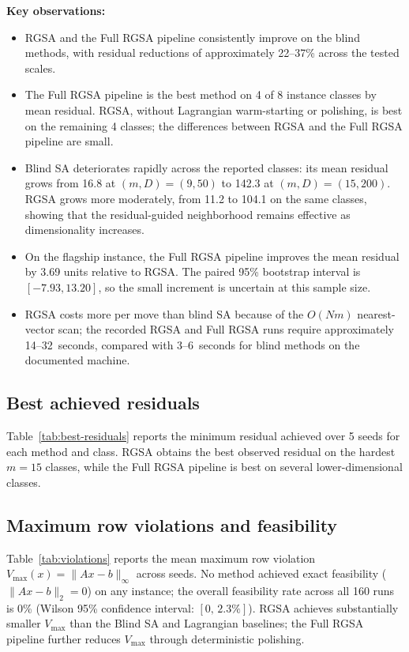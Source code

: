 \documentclass[11pt]{article}
\begin{document}
\textbf{Key observations:}
\begin{itemize}
\item RGSA and the Full RGSA pipeline consistently improve on the blind methods, with residual reductions of approximately 22--37\% across the tested scales.
\item The Full RGSA pipeline is the best method on 4 of 8 instance classes by mean residual. RGSA, without Lagrangian warm-starting or polishing, is best on the remaining 4 classes; the differences between RGSA and the Full RGSA pipeline are small.
\item Blind SA deteriorates rapidly across the reported classes: its mean residual grows from 16.8 at $(m,D)=(9,50)$ to 142.3 at $(m,D)=(15,200)$. RGSA grows more moderately, from 11.2 to 104.1 on the same classes, showing that the residual-guided neighborhood remains effective as dimensionality increases.
\item On the flagship instance, the Full RGSA pipeline improves the mean residual by 3.69 units relative to RGSA. The paired 95\% bootstrap interval is $[-7.93,13.20]$, so the small increment is uncertain at this sample size.
\item RGSA costs more per move than blind SA because of the $O(Nm)$ nearest-vector scan; the recorded RGSA and Full RGSA runs require approximately 14--32~seconds, compared with 3--6~seconds for blind methods on the documented machine.
\end{itemize}

\subsection{Best achieved residuals}

Table~\ref{tab:best-residuals} reports the minimum residual achieved over 5 seeds for each method and class. RGSA obtains the best observed residual on the hardest $m=15$ classes, while the Full RGSA pipeline is best on several lower-dimensional classes.



\subsection{Maximum row violations and feasibility}

Table~\ref{tab:violations} reports the mean maximum row violation $V_{\max}(x)=\|Ax-b\|_\infty$ across seeds. No method achieved exact feasibility ($\|Ax-b\|_2=0$) on any instance; the overall feasibility rate across all 160 runs is 0\% (Wilson 95\% confidence interval: $[0,\,2.3\%]$). RGSA achieves substantially smaller $V_{\max}$ than the Blind SA and Lagrangian baselines; the Full RGSA pipeline further reduces $V_{\max}$ through deterministic polishing.
\end{document}
